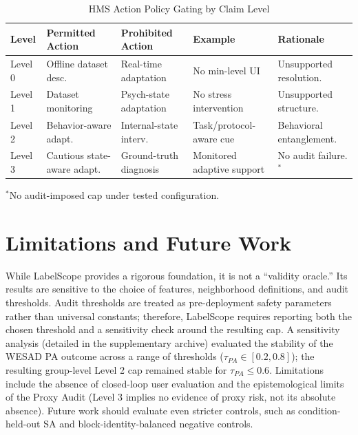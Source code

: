 \documentclass[journal]{IEEEtran}
\begin{document}
\begin{table}[t!]
\caption{HMS Action Policy Gating by Claim Level}
\label{tab:action_policy}
\centering
\begin{tabular}{@{}lp{3cm}p{3cm}p{3cm}p{3.5cm}@{}}
\toprule
\textbf{Level} & \textbf{Permitted Action} & \textbf{Prohibited Action} & \textbf{Example} & \textbf{Rationale} \\
\midrule
Level 0 & Offline dataset desc. & Real-time adaptation & No min-level UI & Unsupported resolution. \\
Level 1 & Dataset monitoring & Psych-state adaptation & No stress intervention & Unsupported structure. \\
Level 2 & Behavior-aware adapt. & Internal-state interv. & Task/protocol-aware cue & Behavioral entanglement. \\
Level 3 & Cautious state-aware adapt. & Ground-truth diagnosis & Monitored adaptive support & No audit failure.$^*$ \\
\bottomrule
\end{tabular}
\smallskip
\begin{minipage}{\textwidth}
\small $^*$No audit-imposed cap under tested configuration.
\end{minipage}
\end{table}

\FloatBarrier
\section{Limitations and Future Work}
While LabelScope provides a rigorous foundation, it is not a ``validity oracle.'' Its results are sensitive to the choice of features, neighborhood definitions, and audit thresholds. Audit thresholds are treated as pre-deployment safety parameters rather than universal constants; therefore, LabelScope requires reporting both the chosen threshold and a sensitivity check around the resulting cap. A sensitivity analysis (detailed in the supplementary archive) evaluated the stability of the WESAD PA outcome across a range of thresholds ($\tau_{PA} \in [0.2, 0.8]$); the resulting group-level Level 2 cap remained stable for $\tau_{PA} \le 0.6$. Limitations include the absence of closed-loop user evaluation and the epistemological limits of the Proxy Audit (Level 3 implies no evidence of proxy risk, not its absolute absence). Future work should evaluate even stricter controls, such as condition-held-out SA and block-identity-balanced negative controls.
\end{document}
